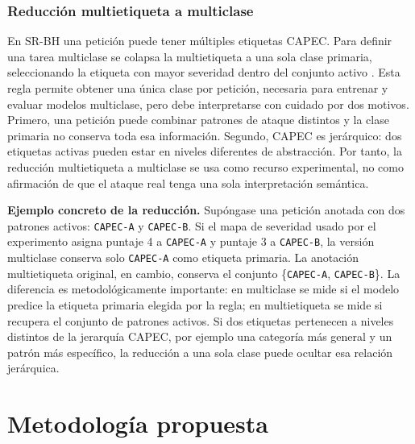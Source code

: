 \documentclass[12pt,oneside]{report}
\begin{document}
\subsection{Reducción multietiqueta a multiclase}
En SR-BH una petición puede tener múltiples etiquetas CAPEC. Para definir una tarea multiclase se colapsa la multietiqueta a una sola clase primaria, seleccionando la etiqueta con mayor severidad dentro del conjunto activo \cite{capec_schema_docs,capec_schema_desc}. Esta regla permite obtener una única clase por petición, necesaria para entrenar y evaluar modelos multiclase, pero debe interpretarse con cuidado por dos motivos. Primero, una petición puede combinar patrones de ataque distintos y la clase primaria no conserva toda esa información. Segundo, CAPEC es jerárquico: dos etiquetas activas pueden estar en niveles diferentes de abstracción. Por tanto, la reducción multietiqueta a multiclase se usa como recurso experimental, no como afirmación de que el ataque real tenga una sola interpretación semántica.

\textbf{Ejemplo concreto de la reducción.} Supóngase una petición anotada con dos patrones activos: \texttt{CAPEC-A} y \texttt{CAPEC-B}. Si el mapa de severidad usado por el experimento asigna puntaje 4 a \texttt{CAPEC-A} y puntaje 3 a \texttt{CAPEC-B}, la versión multiclase conserva solo \texttt{CAPEC-A} como etiqueta primaria. La anotación multietiqueta original, en cambio, conserva el conjunto \{\texttt{CAPEC-A}, \texttt{CAPEC-B}\}. La diferencia es metodológicamente importante: en multiclase se mide si el modelo predice la etiqueta primaria elegida por la regla; en multietiqueta se mide si recupera el conjunto de patrones activos. Si dos etiquetas pertenecen a niveles distintos de la jerarquía CAPEC, por ejemplo una categoría más general y un patrón más específico, la reducción a una sola clase puede ocultar esa relación jerárquica.

\chapter{Metodología propuesta}
\end{document}

